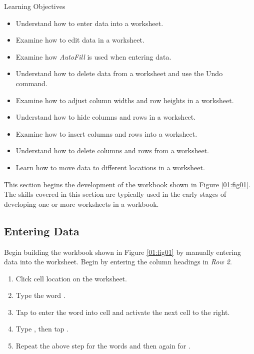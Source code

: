 \begin{center}
	\begin{objbox}{Learning Objectives}
		\begin{itemize}
			\setlength{\itemsep}{0pt}
			\setlength{\parskip}{0pt}
			\setlength{\parsep}{0pt}
			
			\item Understand how to enter data into a worksheet.
			\item Examine how to edit data in a worksheet.
			\item Examine how \textit{AutoFill} is used when entering data.
			\item Understand how to delete data from a worksheet and use the Undo command.
			\item Examine how to adjust column widths and row heights in a worksheet.
			\item Understand how to hide columns and rows in a worksheet.
			\item Examine how to insert columns and rows into a worksheet.
			\item Understand how to delete columns and rows from a worksheet.
			\item Learn how to move data to different locations in a worksheet.

		\end{itemize}
	\end{objbox}
\end{center}

This section begins the development of the workbook shown in Figure \ref{01:fig01}. The skills covered in this section are typically used in the early stages of developing one or more worksheets in a workbook.

\subsection{Entering Data}

Begin building the workbook shown in Figure \ref{01:fig01} by manually entering data into the worksheet. Begin by entering the column headings in \textit{Row 2}.

\begin{enumbox}
	\begin{enumerate}
		\item Click cell location  on the worksheet.
		\item Type the word .
		\item Tap  to enter the word into cell  and activate the next cell to the right.
		\item Type , then tap .
		\item Repeat the above step for the words  and then again for .
	\end{enumerate}
\end{enumbox}
	
